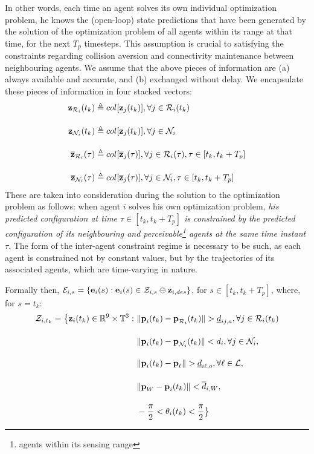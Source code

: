 In other words, each time an agent solves its own individual optimization
problem, he knows the (open-loop) state predictions that have been generated
by the solution of the optimization problem of all agents within
its range at that time, for the next $T_p$ timesteps. This assumption is
crucial to satisfying the constraints regarding collision aversion and
connectivity maintenance between neighbouring agents.
We assume that the above pieces of information are (a) always available and
accurate, and (b) exchanged without delay. We encapsulate these pieces of
information in four stacked vectors:
\begin{subequations}
\begin{align}
  \bm{\mathbf{z}}_{\mathcal{R}_i}(t_k) &\triangleq col[\bm{\mathbf{z}}_j(t_k)], \forall j \in \mathcal{R}_i(t_k) \\[2.5ex]
  \bm{\mathbf{z}}_{\mathcal{N}_i}(t_k) &\triangleq col[\bm{\mathbf{z}}_j(t_k)], \forall j \in \mathcal{N}_i \\[2.5ex]
  \overline{\bm{\mathbf{z}}}_{\mathcal{R}_i}(\tau) &\triangleq col[\overline{\bm{\mathbf{z}}}_j(\tau)], \forall j \in \mathcal{R}_i(\tau), \tau \in [t_k, t_k + T_p] \\[2.5ex]
  \overline{\bm{\mathbf{z}}}_{\mathcal{N}_i}(\tau) &\triangleq col[\overline{\bm{\mathbf{z}}}_j(\tau)], \forall j \in \mathcal{N}_i, \tau \in [t_k, t_k + T_p]
\end{align}
\end{subequations}
These are taken into consideration during the solution to the optimization
problem as follows: when agent $i$ solves his own optimization problem,
\textit{his predicted configuration at time $\tau \in [t_k, t_k + T_p]$ is
constrained by the predicted configuration of its neighbouring and
perceivable\footnote{agents within its sensing range} agents at the same
time instant $\tau$}. The form of the inter-agent constraint regime is necessary
to be such, as each agent is constrained not by constant values, but by
the trajectories of its associated agents, which are time-varying in nature.

Formally then, $\mathcal{E}_{i,s} = \{ \bm{\mathbf{e}}_i(s): \bm{\mathbf{e}}_i(s) \in \mathcal{Z}_{i,s} \ominus \bm{\mathbf{z}}_{i,des}\}$,
for $s \in [t_k, t_k + T_p]$, where, for $s = t_k$:
\begin{align}
  \mathcal{Z}_{i,t_k} = \big\{\bm{\mathbf{z}}_i(t_k) \in \mathbb{R}^{9}\times \mathbb{T}^3 : \
      & \|\bm{\mathbf{p}}_i(t_k) - \bm{\mathbf{p}}_{\mathcal{R}_i}(t_k)\| > \underline{d}_{ij,a}, \forall j \in \mathcal{R}_i(t_k)\\[2.5ex]
      & \|\bm{\mathbf{p}}_i(t_k) - \bm{\mathbf{p}}_{\mathcal{N}_i}(t_k)\| < d_i, \forall j \in \mathcal{N}_i, \\[2.5ex]
      & \|\bm{\mathbf{p}}_i(t_k) - \bm{\mathbf{p}}_{\ell}\| > \underline{d}_{i\ell,o}, \forall \ell \in \mathcal{L}, \\[2.5ex]
      & \|\bm{\mathbf{p}}_W - \bm{\mathbf{p}}_i(t_k)\| < \overline{d}_{i,W}, \\[2.5ex]
      & - \frac{\pi}{2} < \theta_i(t_k) < \frac{\pi}{2} \big\}
\end{align}

